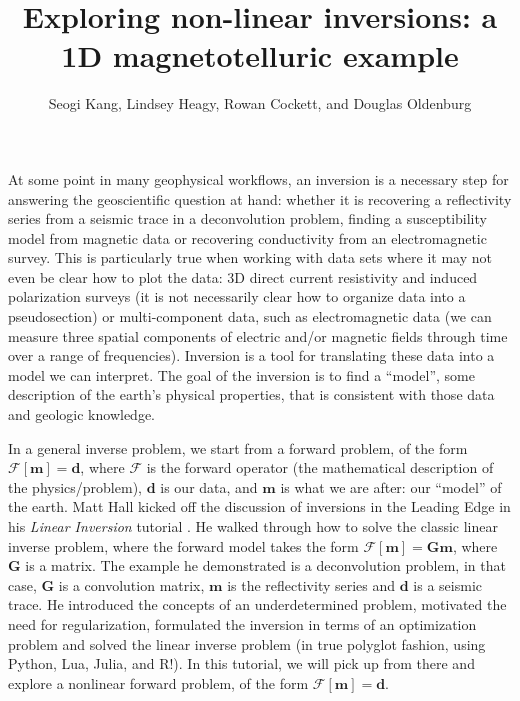 \documentclass[11pt,oneside]{article}
\begin{document}
\title{Exploring non-linear inversions: a 1D magnetotelluric example}
\author{Seogi Kang, Lindsey Heagy, Rowan Cockett, and Douglas Oldenburg}

\maketitle

At some point in many geophysical workflows, an inversion is a necessary step for answering the geoscientific question at hand: whether it is recovering a reflectivity series from a seismic trace in a deconvolution problem, finding a susceptibility model from magnetic data or recovering conductivity from an electromagnetic survey. This is particularly true when working with data sets where it may not even be clear how to plot the data: 3D direct current resistivity and induced polarization surveys (it is not necessarily clear how to organize data into a pseudosection) or multi-component data, such as electromagnetic data (we can measure three spatial components of electric and/or magnetic fields through time over a range of frequencies). Inversion is a tool for translating these data into a model we can interpret. The goal of the inversion is to find a ``model'', some description of the earth’s physical properties, that is consistent with those data and geologic knowledge.

In a general inverse problem, we start from a forward problem, of the form $\mathcal{F}[\mathbf{m}] = \mathbf{d}$, where $\mathcal{F}$ is the forward operator (the mathematical description of the physics/problem), $\mathbf{d}$ is our data, and $\mathbf{m}$ is what we are after: our ``model'' of the earth. Matt Hall kicked off the discussion of inversions in the Leading Edge in his \emph{Linear Inversion} tutorial \citep{HallTutorial}. He walked through how to solve the classic linear inverse problem, where the forward model takes the form $\mathcal{F}[\mathbf{m}] = \mathbf{G}\mathbf{m}$, where $\mathbf{G}$ is a matrix. The example he demonstrated is a deconvolution problem, in that case, $\mathbf{G}$ is a convolution matrix, $\mathbf{m}$ is the reflectivity series and $\mathbf{d}$ is a seismic trace. He introduced the concepts of an underdetermined problem, motivated the need for regularization, formulated the inversion in terms of an optimization problem and solved the linear inverse problem (in true polyglot fashion, using Python, Lua, Julia, and R!). In this tutorial, we will pick up from there and explore a nonlinear forward problem, of the form $\mathcal{F}[\mathbf{m}] = \mathbf{d}$.
\end{document}
